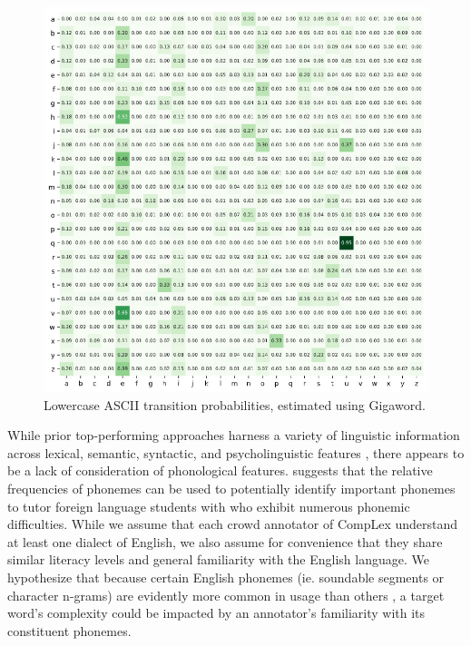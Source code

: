 \documentclass{dcthesis}
\theoremstyle{definition}
\theoremstyle{remark}
\begin{document}
\begin{figure}
  \centering
  \includegraphics[scale=0.55]{character_transition_probabilities.png}
  \captionsetup{justification=centering}
  \caption{\label{fig:character_transition_probabilities} Lowercase ASCII transition probabilities, estimated using Gigaword.}
\end{figure}

While prior top-performing approaches harness a variety of  linguistic information across lexical, semantic, syntactic, and psycholinguistic features \citep{paetzoldspecia2016sv000gg, ronzanoetal2016taln, mukherjeeetal2016ju}, there appears to be a lack of consideration of phonological features. \citet{doi10108000437956195011659381} suggests that the relative frequencies of phonemes can be used to potentially identify important phonemes to tutor foreign language students with who exhibit numerous phonemic difficulties. While we assume that each crowd annotator of CompLex understand at least one dialect of English, we also assume for convenience that they share similar literacy levels and general familiarity with the English language. We hypothesize that because certain English phonemes (ie. soundable segments or character n-grams) are evidently more common in usage than others \citep{doi10108000437956195011659381}, a target word's complexity could be impacted by an annotator's familiarity with its constituent phonemes.
\end{document}

